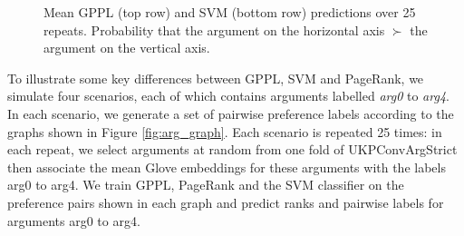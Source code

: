 \begin{figure}
{}
\caption{Mean GPPL (top row) and SVM (bottom row) predictions over 25 repeats. Probability that the argument 
on the horizontal axis $\succ$ the argument on the vertical axis.}
\label{fig:cycle_demo_classification}
\end{figure}

To illustrate some key differences between GPPL, SVM and PageRank,
we simulate four scenarios, each of which contains arguments labelled \emph{arg0} to \emph{arg4}.  
In each scenario, we generate a set of pairwise preference labels according to the 
graphs shown in Figure \ref{fig:arg_graph}.
Each scenario is repeated 25 times: in each repeat, we select arguments at random from one fold of UKPConvArgStrict
then associate the mean Glove embeddings for these arguments with the labels arg0 to arg4. 
We train GPPL, PageRank and the SVM classifier on the preference pairs shown in each graph and
predict ranks and pairwise labels for arguments arg0 to arg4.

